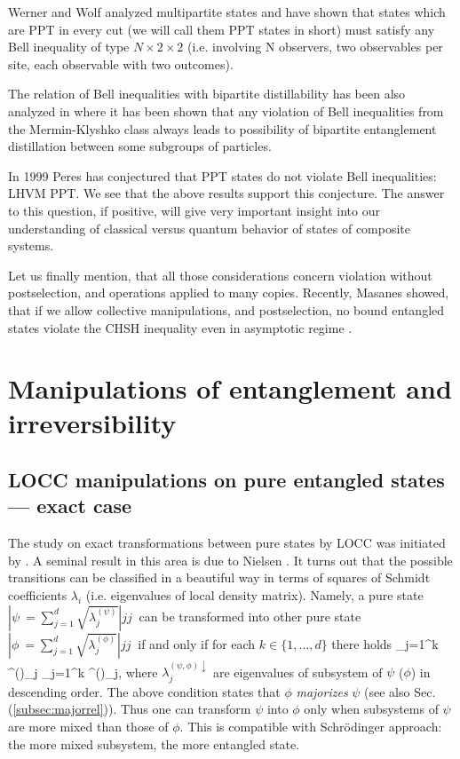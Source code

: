 \documentclass[rmp,12pt,preprint]{revtex4-2}
\begin{document}
Werner and Wolf analyzed multipartite states
\cite{WernerW1999-PPTBell,WernerW2001-Bell-review} and have shown that
states which are PPT in every cut (we will call them PPT states in
short) must satisfy any Bell inequality of type $N \times 2 \times 2 $
(i.e. involving N observers, two observables per site, each observable
with two outcomes).

The relation of Bell inequalities with bipartite distillability has
been also analyzed in \cite{AcinGT2006-grot} where it has been shown
that any violation of Bell inequalities from the Mermin-Klyshko class
always leads to possibility of bipartite entanglement distillation
between some subgroups of particles.

In 1999 Peres has conjectured \cite{Peres1999-PPTBell} that PPT
states do not violate Bell inequalities: \be LHVM \Leftrightarrow
PPT. \label{Peres} \ee We see that the above results support
this conjecture. The answer to this question, if positive, will
give very important insight into our understanding of classical
versus quantum behavior of states of composite systems.

Let us finally mention, that all those considerations concern
violation without postselection, and operations applied to many
copies. Recently, Masanes showed, that if we allow collective
manipulations, and postselection, no bound entangled states violate
the CHSH inequality even in asymptotic regime \cite{Masanes}.


\section{Manipulations of entanglement and irreversibility}
\label{sec:irrev}
\subsection{LOCC manipulations on pure entangled states --- exact case}
\label{subsec:puretrans}
The study on exact transformations between pure states
by LOCC was initiated by \cite{LoPopsecu1997-beyond}.
A seminal result in this area is due to Nielsen \cite{Nielsen-pure-entanglement}. It turns out that the
possible transitions can be classified in a beautiful way in terms of
squares of Schmidt coefficients $\lambda_i$ (i.e. eigenvalues of
local density matrix).
Namely, a pure state $|\psi\>=\sum_{j=1}^d\sqrt{\lambda^{(\psi)}_j}|jj\>$ can be transformed into other pure state $|\phi\>=\sum_{j=1}^d\sqrt{\lambda^{(\phi)}_j}|jj\>$ if and only if for each $k \in \{1,\ldots,d\}$ there holds
\be
\sum_{j=1}^k \lambda^{(\psi)\downarrow}_j \leq  \sum_{j=1}^k \lambda^{(\phi)\downarrow}_j,
\label{eq:major}
\ee
where $\lambda^{(\psi,\phi)\downarrow}_j$ are eigenvalues of subsystem
of $\psi$ ($\phi$) in descending order.
The above condition states that $\phi$ {\it majorizes} $\psi$ (see also Sec. (\ref{subsec:majorrel})). Thus one can transform $\psi$ into $\phi$ only when subsystems of $\psi$  are more mixed than those of $\phi$. This is compatible with Schr{\"o}dinger approach: the more mixed subsystem, the more entangled state.
\end{document}
